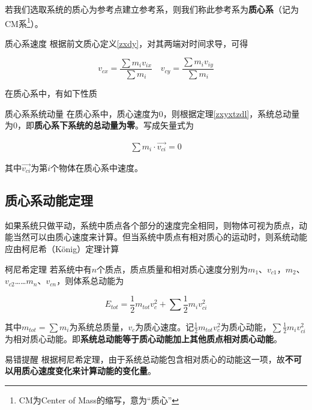 若我们选取系统的质心为参考点建立参考系，则我们称此参考系为\textbf{质心系}（记为CM系\footnote{CM为Center of Mass的缩写，意为“质心”}）。

\begin{theo}[label=zxxsd]{质心系速度}{}
根据前文质心定义\eqref{zxdy}，对其两端对时间求导，可得

$$v_{cx} = \frac{\sum m_i v_{ix}}{\sum m_i} \quad v_{cy} = \frac{\sum m_i v_{iy}}{\sum m_i}$$
\end{theo}

在质心系中，有如下性质

\begin{theo}{质心系系统动量}{}
在质心系中，质心速度为$0$，则根据定理\eqref{zxyxtzdl}，系统总动量为$0$，即\textbf{质心系下系统的总动量为零}。写成矢量式为

\begin{subequations}
\label{e_zxxdl}
\begin{align*}
\sum m_i \cdot \vec{v_{ci}} = 0
\end{align*}
\end{subequations}

其中$\vec{v_{ci}}$为第$i$个物体在质心系中速度。
\end{theo}

\subsection{质心系动能定理}

如果系统只做平动，系统中质点各个部分的速度完全相同，则物体可视为质点，动能当然可以由质心速度来计算。但当系统中质点有相对质心的运动时，则系统动能应由柯尼希（König）定理计算

\begin{theo}[label=knxdl]{柯尼希定理}{}
若系统中有$n$个质点，质点质量和相对质心速度分别为$m_1$、$v_{c1}$，$m_2$、$v_{c2}$……$m_n$、$v_{cn}$，则体系总动能为

$$E_{tot}=\frac{1}{2} m_{tot} v_c^2 + \sum \frac{1}{2} m_i v_{ci}^2$$

其中$m_{tot} = \sum m_i$为系统总质量，$v_c$为质心速度。记$\frac{1}{2} m_{tot} v_c^2$为质心动能，$\sum \frac{1}{2} m_i v_{ci}^2$为相对质心动能。即\textbf{系统总动能等于质心动能加上其他质点相对质心动能}。
\end{theo}

\begin{mk}{易错提醒}{}
根据柯尼希定理，由于系统总动能包含相对质心的动能这一项，故\textbf{不可以用质心速度变化来计算动能的变化量}。
\end{mk}


